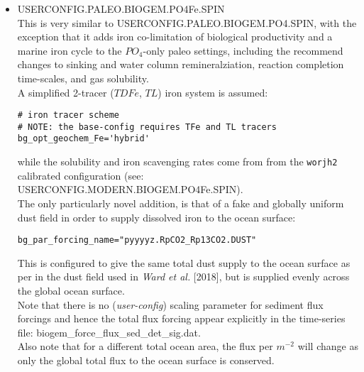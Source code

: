 \begin{itemize}[noitemsep]
\vspace{2mm}
\item \textsf{\small USERCONFIG.PALEO.BIOGEM.PO4Fe.SPIN}
\vspace{1mm}
\\This is very similar to \textsf{\footnotesize USERCONFIG.PALEO.BIOGEM.PO4.SPIN}, with the exception that it adds iron co-limitation of biological productivity and a marine iron cycle to the \(PO_{4}\)-only paleo settings, including the recommend changes to sinking and water column remineralziation, reaction completion time-scales, and gas solubility.
\\A simplified 2-tracer (\(TDFe\), \(TL\)) iron system is assumed:
\small\vspace{-1mm}\begin{verbatim}
# iron tracer scheme
# NOTE: the base-config requires TFe and TL tracers
bg_opt_geochem_Fe='hybrid'
\end{verbatim}\vspace{-1mm}\normalsize
while the solubility and iron scavenging rates  come from from the \texttt{worjh2} calibrated configuration (see: \textsf{\footnotesize USERCONFIG.MODERN.BIOGEM.PO4Fe.SPIN}).
\\The only particularly novel addition, is that of a fake and globally uniform dust field in order to supply dissolved iron to the ocean surface:
\small\vspace{-1mm}\begin{verbatim}
bg_par_forcing_name="pyyyyz.RpCO2_Rp13CO2.DUST"
\end{verbatim}\vspace{-1mm}\normalsize
This is configured to give the same total dust supply to the ocean surface as per in the dust field used in \textit{Ward et al.} [2018], but is supplied evenly across the global ocean surface.
\\Note that there is no (\textit{user-config}) scaling parameter for sediment flux forcings and hence the total flux forcing appear explicitly in the time-series file: \textsf{\footnotesize biogem\_force\_flux\_sed\_det\_sig.dat}.
\\Also note that for a different total ocean area, the flux per \(m^{-2}\) will change as only the global total flux to the ocean surface is conserved.


\end{itemize}
